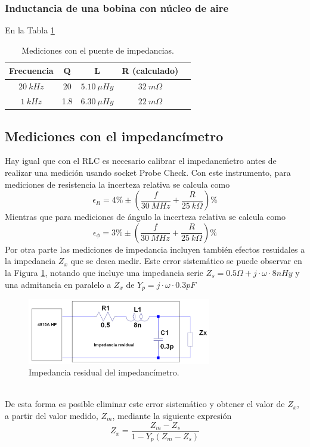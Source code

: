 \documentclass[a4paper,10pt]{article}
\begin{document}
		\subsubsection{Inductancia de una bobina con n\'ucleo de aire}
		En la Tabla \ref{tabPUENTEbobina}
		\begin{table}[!htp]
			\centering
			\begin{tabular}{|c|c|c|c|c|}
				\hline
				Frecuencia & Q & L  & R (calculado) \\
				\hline
				$20~kHz$& 20 & $5.10~\mu Hy$ &$ 32~m\Omega$ \\
				\hline
				$1~kHz$& 1.8 & $6.30~\mu Hy$ &$ 22~m\Omega$ \\
				\hline	  
			\end{tabular}
			\caption{Mediciones con el puente de impedancias.} \label{tabPUENTEbobina}
		\end{table}	
		
		
		\subsection{Mediciones con el impedanc\'imetro}
		Hay igual que con el RLC es necesario calibrar el impedanc\'metro antes de realizar una medici\'on usando socket Probe Check.
		Con este instrumento, para mediciones de resistencia la incerteza relativa se calcula como
		$$\epsilon_R=4\%\pm(\frac{f}{30~MHz}+\frac{R}{25~k\Omega})\%$$
		Mientras que para mediciones de \'angulo la incerteza relativa se calcula como
		$$\epsilon_\phi=3\%\pm(\frac{f}{30~MHz}+\frac{R}{25~k\Omega})\%$$
		Por otra parte las mediciones de impedancia incluyen tambi\'en efectos resuidales a la impedancia $Z_x$ que se desea medir. Este error sistem\'atico se puede observar en la Figura \ref{impres}, notando que incluye una impedancia serie $Z_s=0.5\Omega+j\cdot\omega\cdot8nHy$ y una admitancia en paralelo a $Z_x$ de $Y_p=j\cdot\omega\cdot0.3pF$
					\begin{figure}[!htb]
						\centering
						\includegraphics[width=8cm]
						{Imagenes/impedanciares.png}
						\caption{Impedancia residual del impedanc\'imetro.}
						\label{impres} 
					\end{figure}\\
		De esta forma es posible eliminar este error sistem\'atico y obtener el valor de $Z_x$, a partir del valor medido, $Z_m$, mediante la siguiente expresi\'on
		$$Z_x=\frac{Z_m-Z_s}{1-Y_p(Z_m-Z_s)}$$
\end{document}
